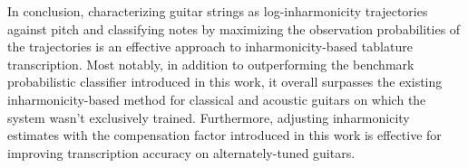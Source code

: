 \documentclass[12pt]{cmuthesis}
\begin{document}
In conclusion, characterizing guitar strings as log-inharmonicity trajectories against pitch and classifying notes by maximizing the observation probabilities of the trajectories is an effective approach to inharmonicity-based tablature transcription. Most notably, in addition to outperforming the benchmark probabilistic classifier introduced in this work, it overall surpasses the existing inharmonicity-based method for classical and acoustic guitars on which the system wasn't exclusively trained. Furthermore, adjusting inharmonicity estimates with the compensation factor introduced in this work is effective for improving transcription accuracy on alternately-tuned guitars.




%

\backmatter


\renewcommand{\bibsection}{\chapter{\bibname}}

\end{document}

